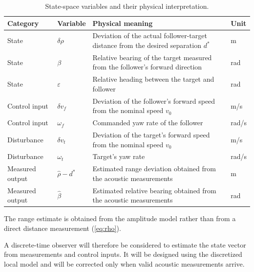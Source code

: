 \documentclass[journal,a4paper]{IEEEtran}
\begin{document}
\begin{table}[!t]
\centering
\caption{State-space variables and their physical interpretation.}
\label{tab:model_variables}
\small
\renewcommand{\arraystretch}{1.15}
\begin{tabular}{p{} p{} p{} p{}}
\hline
\textbf{Category} & \textbf{Variable} & \textbf{Physical meaning} & \textbf{Unit}\\
\hline
State
& $\delta\rho$
& Deviation of the actual follower-target distance  from the desired separation $d^\ast$
& m\\

State
& $\beta$
& Relative bearing of the target measured from the follower's forward direction
& rad\\

State
& $\varepsilon$
& Relative heading between the target and follower
& rad\\

Control input
& $\delta v_f$
& Deviation of the follower's forward speed from the nominal speed $v_0$
& m/s\\

Control input
& $\omega_f$
& Commanded yaw rate of the follower
& rad/s\\

Disturbance
& $\delta v_t$
& Deviation of the target's forward speed from the nominal speed $v_0$
& m/s\\

Disturbance
& $\omega_t$
& Target's yaw rate
& rad/s\\

Measured output
& $\hat{\rho}-d^\ast$
& Estimated range deviation obtained from the acoustic measurements
& m\\

Measured output
& $\hat{\beta}$
& Estimated relative bearing obtained from the acoustic measurements
& rad\\
\hline
\end{tabular}
\end{table}

The range estimate is obtained from the amplitude model rather than from a direct distance measurement (\autoref{eq:rho}). 

A discrete-time observer will therefore be considered to estimate the state vector from measurements and control inputs. It will be designed using the discretized local model and will be corrected only when valid acoustic measurements arrive. 
\end{document}
